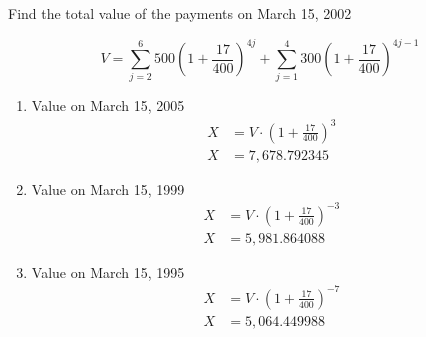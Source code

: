 \documentclass[a4paper, 12pt, reqno]{amsart}
\numberwithin{equation}{section}
\begin{document}
Find the total value of the payments on March 15, 2002

\begin{equation}\nonumber
    V = \sum_{j=2}^6{500\left(1+\frac{17}{400}\right)^{4j}}
        + \sum_{j=1}^4{300\left(1+\frac{17}{400}\right)^{4j-1}} 
\end{equation}

\begin{enumerate}[label=(\alph*)]
    \item Value on March 15, 2005
        \begin{equation}\nonumber
            \begin{aligned}
                X &= V \cdot \left(1 + \frac{17}{400}\right)^3      \\
                X &= 7,678.792345
            \end{aligned}
        \end{equation}
    \item Value on March 15, 1999
        \begin{equation}\nonumber
            \begin{aligned}
                X &= V \cdot \left(1 + \frac{17}{400}\right)^{-3}   \\
                X &= 5,981.864088
            \end{aligned}
        \end{equation}
    \item Value on March 15, 1995
        \begin{equation}\nonumber
            \begin{aligned}
                X &= V \cdot \left(1 + \frac{17}{400}\right)^{-7}   \\
                X &= 5,064.449988
            \end{aligned}
        \end{equation}
\end{enumerate}
\end{document}
